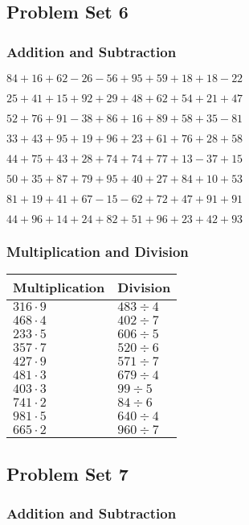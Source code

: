 \hypertarget{problem-set-6}{%
\subsection{Problem Set 6}\label{problem-set-6}}

\hypertarget{addition-and-subtraction-5}{%
\subsubsection{Addition and
Subtraction}\label{addition-and-subtraction-5}}

\(84+16+62-26-56+95+59+18+18-22\)

\(25+41+15+92+29+48+62+54+21+47\)

\(52+76+91-38+86+16+89+58+35-81\)

\(33+43+95+19+96+23+61+76+28+58\)

\(44+75+43+28+74+74+77+13-37+15\)

\(50+35+87+79+95+40+27+84+10+53\)

\(81+19+41+67-15-62+72+47+91+91\)

\(44+96+14+24+82+51+96+23+42+93\)

\hypertarget{multiplication-and-division-5}{%
\subsubsection{Multiplication and
Division}\label{multiplication-and-division-5}}

\begin{longtable}[]{@{}ll@{}}
\toprule
Multiplication & Division\tabularnewline
\midrule
\endhead
\(316\cdot9\) & \(483÷4\)\tabularnewline
\(468\cdot4\) & \(402÷7\)\tabularnewline
\(233\cdot5\) & \(606÷5\)\tabularnewline
\(357\cdot7\) & \(520÷6\)\tabularnewline
\(427\cdot9\) & \(571÷7\)\tabularnewline
\(481\cdot3\) & \(679÷4\)\tabularnewline
\(403\cdot3\) & \(99÷5\)\tabularnewline
\(741\cdot2\) & \(84 ÷6\)\tabularnewline
\(981\cdot5\) & \(640÷4\)\tabularnewline
\(665\cdot2\) & \(960÷7\)\tabularnewline
\bottomrule
\end{longtable}

\hypertarget{problem-set-7}{%
\subsection{Problem Set 7}\label{problem-set-7}}

\hypertarget{addition-and-subtraction-6}{%
\subsubsection{Addition and
Subtraction}\label{addition-and-subtraction-6}}


